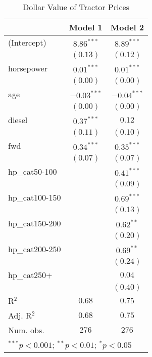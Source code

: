 
\begin{table}
\begin{center}
\begin{tabular}{l c c}
\hline
 & Model 1 & Model 2 \\
\hline
(Intercept)    & $8.86^{***}$  & $8.89^{***}$  \\
               & $(0.13)$      & $(0.12)$      \\
horsepower     & $0.01^{***}$  & $0.01^{***}$  \\
               & $(0.00)$      & $(0.00)$      \\
age            & $-0.03^{***}$ & $-0.04^{***}$ \\
               & $(0.00)$      & $(0.00)$      \\
diesel         & $0.37^{***}$  & $0.12$        \\
               & $(0.11)$      & $(0.10)$      \\
fwd            & $0.34^{***}$  & $0.35^{***}$  \\
               & $(0.07)$      & $(0.07)$      \\
hp\_cat50-100  &               & $0.41^{***}$  \\
               &               & $(0.09)$      \\
hp\_cat100-150 &               & $0.69^{***}$  \\
               &               & $(0.13)$      \\
hp\_cat150-200 &               & $0.62^{**}$   \\
               &               & $(0.20)$      \\
hp\_cat200-250 &               & $0.69^{**}$   \\
               &               & $(0.24)$      \\
hp\_cat250+    &               & $0.04$        \\
               &               & $(0.40)$      \\
\hline
R$^2$          & $0.68$        & $0.75$        \\
Adj. R$^2$     & $0.68$        & $0.75$        \\
Num. obs.      & $276$         & $276$         \\
\hline
\multicolumn{3}{l}{\scriptsize{$^{***}p<0.001$; $^{**}p<0.01$; $^{*}p<0.05$}}
\end{tabular}
\caption{Dollar Value of Tractor Prices}
\label{tab:hp_cat}
\end{center}
\end{table}
